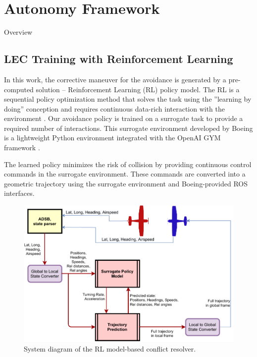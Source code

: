 \section{Autonomy Framework}

Overview



\subsection{LEC Training with Reinforcement Learning}

In this work, the corrective maneuver for the avoidance is generated by a pre-computed solution -- Reinforcement Learning (RL) policy model. 
The RL is a sequential policy optimization method that solves the task using the ''learning by doing'' conception and requires continuous data-rich interaction with the environment \cite{sutton2018reinforcement}. 
Our avoidance policy is trained on a surrogate task to provide a required number of interactions. 
This surrogate environment developed by Boeing is a lightweight Python environment integrated with the OpenAI GYM framework \cite{brockman2016openai}.

The learned policy minimizes the risk of collision by providing continuous control commands in the surrogate environment. These commands are converted into a geometric trajectory using the surrogate environment and Boeing-provided ROS interfaces.

\begin{figure}[h]
	\centering
	\includegraphics[width=\linewidth]{figures/system_overview.pdf}
	\caption{System diagram of the RL model-based conflict resolver.}
	\label{fig:diagram}
\end{figure}


